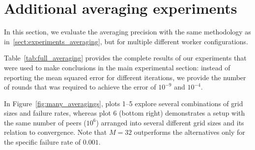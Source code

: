\section{Additional averaging experiments}
\label{sect:extra_averaging}

In this section, we evaluate the averaging precision with the same methodology as in~\ref{sect:experiments_averaging}, but for multiple different worker configurations. 

Table~\ref{tab:full_averaging} provides the complete results of our experiments that were used to make conclusions in the main experimental section: instead of reporting the mean squared error for different iterations, we provide the number of rounds that was required to achieve the error of $10^{-9}$ and $10^{-4}$.

In Figure~\ref{fig:many_averagings}, plots 1--5 explore several combinations of grid sizes and failure rates, whereas plot 6 (bottom right) demonstrates a setup with the same number of peers ($10^6$) arranged into several different grid sizes and its relation to convergence. Note that $M{=}32$ outperforms the alternatives only for the specific failure rate of $0.001$.

